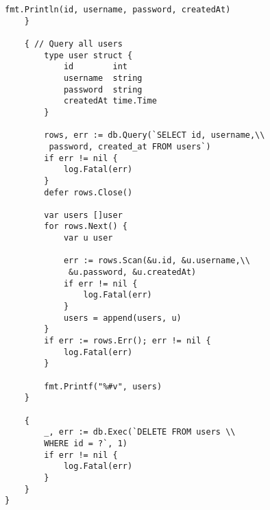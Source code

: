 \begin{lstlisting}[numbers=none]
        fmt.Println(id, username, password, createdAt)
    }

    { // Query all users
        type user struct {
            id        int
            username  string
            password  string
            createdAt time.Time
        }

        rows, err := db.Query(`SELECT id, username,\\
         password, created_at FROM users`)
        if err != nil {
            log.Fatal(err)
        }
        defer rows.Close()

        var users []user
        for rows.Next() {
            var u user

            err := rows.Scan(&u.id, &u.username,\\
             &u.password, &u.createdAt)
            if err != nil {
                log.Fatal(err)
            }
            users = append(users, u)
        }
        if err := rows.Err(); err != nil {
            log.Fatal(err)
        }

        fmt.Printf("%#v", users)
    }

    {
        _, err := db.Exec(`DELETE FROM users \\
        WHERE id = ?`, 1)
        if err != nil {
            log.Fatal(err)
        }
    }
}
\end{lstlisting}







